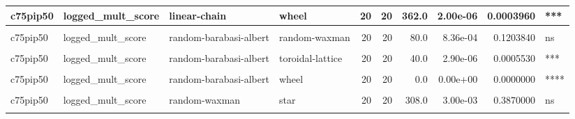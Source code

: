 \documentclass[
]{book}
\begin{document}
\begin{table}
\begin{tabular}{l|l|l|l|r|r|r|r|r|l}
\hline
c75pip50 & logged\_mult\_score & linear-chain & wheel & 20 & 20 & 362.0 & 2.00e-06 & 0.0003960 & ***\\
\hline
\cellcolor{gray!6}{c75pip50} & \cellcolor{gray!6}{logged\_mult\_score} & \cellcolor{gray!6}{linear-chain} & \cellcolor{gray!6}{windmill} & \cellcolor{gray!6}{20} & \cellcolor{gray!6}{20} & \cellcolor{gray!6}{399.0} & \cellcolor{gray!6}{0.00e+00} & \cellcolor{gray!6}{0.0000000} & \cellcolor{gray!6}{****}\\
\hline
c75pip50 & logged\_mult\_score & random-barabasi-albert & random-waxman & 20 & 20 & 80.0 & 8.36e-04 & 0.1203840 & ns\\
\hline
\cellcolor{gray!6}{c75pip50} & \cellcolor{gray!6}{logged\_mult\_score} & \cellcolor{gray!6}{random-barabasi-albert} & \cellcolor{gray!6}{star} & \cellcolor{gray!6}{20} & \cellcolor{gray!6}{20} & \cellcolor{gray!6}{0.0} & \cellcolor{gray!6}{0.00e+00} & \cellcolor{gray!6}{0.0000000} & \cellcolor{gray!6}{****}\\
\hline
c75pip50 & logged\_mult\_score & random-barabasi-albert & toroidal-lattice & 20 & 20 & 40.0 & 2.90e-06 & 0.0005530 & ***\\
\hline
\cellcolor{gray!6}{c75pip50} & \cellcolor{gray!6}{logged\_mult\_score} & \cellcolor{gray!6}{random-barabasi-albert} & \cellcolor{gray!6}{well-mixed} & \cellcolor{gray!6}{20} & \cellcolor{gray!6}{20} & \cellcolor{gray!6}{249.0} & \cellcolor{gray!6}{1.92e-01} & \cellcolor{gray!6}{1.0000000} & \cellcolor{gray!6}{ns}\\
\hline
c75pip50 & logged\_mult\_score & random-barabasi-albert & wheel & 20 & 20 & 0.0 & 0.00e+00 & 0.0000000 & ****\\
\hline
\cellcolor{gray!6}{c75pip50} & \cellcolor{gray!6}{logged\_mult\_score} & \cellcolor{gray!6}{random-barabasi-albert} & \cellcolor{gray!6}{windmill} & \cellcolor{gray!6}{20} & \cellcolor{gray!6}{20} & \cellcolor{gray!6}{0.0} & \cellcolor{gray!6}{0.00e+00} & \cellcolor{gray!6}{0.0000000} & \cellcolor{gray!6}{****}\\
\hline
c75pip50 & logged\_mult\_score & random-waxman & star & 20 & 20 & 308.0 & 3.00e-03 & 0.3870000 & ns\\
\hline
\cellcolor{gray!6}{c75pip50} & \cellcolor{gray!6}{logged\_mult\_score} & \cellcolor{gray!6}{random-waxman} & \cellcolor{gray!6}{toroidal-lattice} & \cellcolor{gray!6}{20} & \cellcolor{gray!6}{20} & \cellcolor{gray!6}{114.0} & \cellcolor{gray!6}{2.00e-02} & \cellcolor{gray!6}{1.0000000} & \cellcolor{gray!6}{ns}\\
\hline

\end{tabular}
\end{table}
\end{document}
